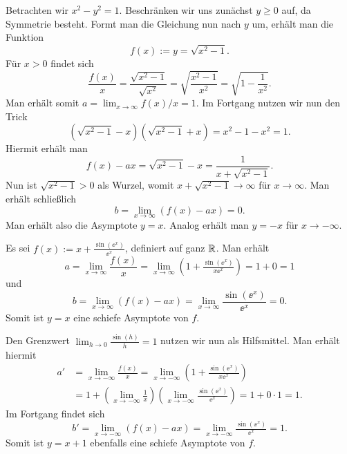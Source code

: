  Betrachten wir $x^2-y^2=1$. Beschränken wir uns
zunächst $y\ge 0$ auf, da Symmetrie besteht. Formt man die Gleichung
nun nach $y$ um, erhält man die Funktion
\[f(x) := y = \sqrt{x^2-1}.\]
Für $x>0$ findet sich
\[\frac{f(x)}{x} = \frac{\sqrt{x^2-1}}{\sqrt{x^2}}
= \sqrt{\frac{x^2-1}{x^2}} = \sqrt{1-\frac{1}{x^2}}.\]
Man erhält somit $a = \lim_{x\to\infty} f(x)/x = 1$. Im Fortgang nutzen
wir nun den Trick
\[(\sqrt{x^2-1}-x)(\sqrt{x^2-1}+x) = x^2-1-x^2 = 1.\]
Hiermit erhält man
\[f(x) - ax = \sqrt{x^2-1}-x = \frac{1}{x+\sqrt{x^2-1}}.\]
Nun ist $\sqrt{x^2-1}>0$ als Wurzel, womit $x+\sqrt{x^2-1}\to\infty$
für $x\to\infty$. Man erhält schließlich
\[b = \lim_{x\to\infty} (f(x)-ax) = 0.\]
Man erhält also die Asymptote $y=x$. Analog erhält man $y=-x$ für
$x\to -\infty$.

Es sei $f(x):=x+\tfrac{\sin(\ee^x)}{\ee^x}$, definiert auf ganz $\mathbb R$.
Man erhält
\[a = \lim_{x\to\infty}\frac{f(x)}{x} = \lim_{x\to\infty} (1+\tfrac{\sin(\ee^x)}{x\ee^x})
= 1+0 = 1\]
und
\[b = \lim_{x\to\infty}(f(x)-ax) = \lim_{x\to\infty}\frac{\sin(\ee^x)}{\ee^x} = 0.\]
Somit ist $y = x$ eine schiefe Asymptote von $f$.

Den Grenzwert $\lim_{h\to 0}\frac{\sin(h)}{h}=1$ nutzen wir nun
als Hilfsmittel. Man erhält hiermit
\begin{align*}
a' &= \lim_{x\to -\infty}\frac{f(x)}{x} =
\lim_{x\to -\infty}(1+\tfrac{\sin(\ee^x)}{x\ee^x})\\
&= 1+(\lim_{x\to -\infty}\tfrac{1}{x})(\lim_{x\to -\infty}\tfrac{\sin(\ee^x)}{\ee^x})
= 1+0\cdot 1 = 1.
\end{align*}
Im Fortgang findet sich
\[b' = \lim_{x\to -\infty} (f(x)-ax) = \lim_{x\to -\infty}\tfrac{\sin(\ee^x)}{\ee^x}
= 1.\]
Somit ist $y = x+1$ ebenfalls eine schiefe Asymptote von $f$.
